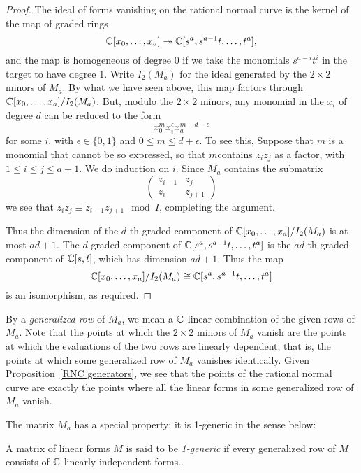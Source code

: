 \begin{proof}
The ideal of forms vanishing on the rational normal curve is the kernel of the map of graded rings
$$
{\mathbb C}[x_{0},\dots, x_{a}] \twoheadrightarrow {\mathbb C}[s^{a}, s^{a-1}t, \dots,t^{a}],
$$
and the map is homogeneous of degree 0 if we take the monomials $s^{a-i}t^{i}$ in the target to have 
degree 1. Write $I_{2}(M_{a})$ for the ideal generated by the $2\times 2$ minors of $M_{a}$. By what we have seen above, this map factors through 
${\mathbb C}[x_{0},\dots, x_{a}]/I_{2}(M_{a})$. But,
modulo the $2\times 2$ minors, any monomial in the $x_{i}$ of degree $d$ can be reduced to the form 
$$
x_{0}^{m} x_{i}^{\epsilon} x_{a}^{m-d-\epsilon}
$$
for some $i$, with $\epsilon\in \{0,1\}$ and $0\leq m\leq d+\epsilon$. To see this,
Suppose that $m$ is a monomial that cannot be so expressed, so that $m$contains $z_iz_j$ as a factor, with $1\leq i\leq j\leq a-1$. We do induction on $i$. Since
$M_a$ contains the submatrix
$$
\begin{pmatrix}
 z_{i-1} & z_{j}\\
 z_i & z_{j+1}
\end{pmatrix}
$$
we see that $z_iz_j \equiv z_{i-1}z_{j+1} \mod I$, completing the argument.

Thus the dimension of the $d$-th graded
component of ${\mathbb C}[x_{0},\dots, x_{a}]/I_{2}(M_{a})$ is at most $ad+1$. The
$d$-graded component of ${\mathbb C}[s^{a}, s^{a-1}t, \dots,t^{a}]$ is the $ad$-th graded component of
${\mathbb C}[s,t]$, which has dimension $ad+1$. Thus the  map 
$$
{\mathbb C}[x_{0},\dots, x_{a}]/I_{2}(M_{a})\cong {\mathbb C}[s^{a}, s^{a-1}t, \dots,t^{a}]
$$ 
is an isomorphism, as required.
\end{proof}

By a \emph{generalized row} of $M_{a}$, we mean a ${\mathbb C}$-linear combination of the given rows of $M_{a}$. Note that the points at which the $2\times 2$ minors of $M_{a}$ vanish are the points at which the evaluations of the two rows are linearly dependent; that is, the points at which some
generalized row of $M_{a}$ vanishes identically. Given Proposition~\ref{RNC generators}, we see that the points of the rational normal curve are exactly the points where all the linear forms in some generalized row
of $M_{a}$ vanish.

The matrix $M_{a}$ has a special property: it is 1-generic in the sense below:

\begin{definition}
 A matrix of linear forms $M$ is said to be \emph{1-generic} if every generalized row of $M$
 consists of ${\mathbb C}$-linearly independent forms.. 
 \end{definition}

